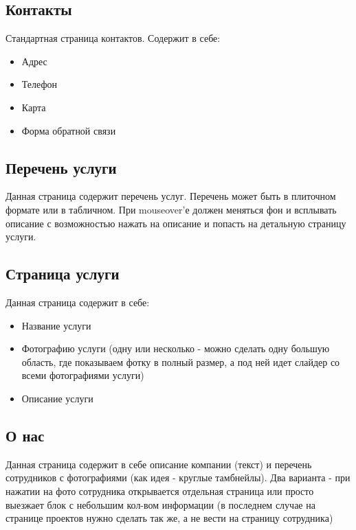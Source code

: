 \documentclass[DIV=calc, paper=a4, fontsize=11pt]{scrartcl} %
\begin{document}
\subsection{Контакты}

Стандартная страница контактов. Содержит в себе:

\begin{itemize}
	\item Адрес
	\item Телефон
	\item Карта
	\item Форма обратной связи
\end{itemize}

\subsection{Перечень услуги}
Данная страница содержит перечень услуг. Перечень может быть в плиточном формате или в табличном. При mouseover'е должен меняться фон и всплывать описание с возможностью нажать на описание и попасть на детальную страницу услуги.

\subsection{Страница услуги}
Данная страница содержит в себе:
\begin{itemize}
	\item Название услуги
	\item Фотографию услуги (одну или несколько - можно сделать одну большую область, где показываем фотку в полный размер, а под ней идет слайдер со всеми фотографиями услуги)
	\item Описание услуги
\end{itemize}

\subsection{О нас}
Данная страница содержит в себе описание компании (текст) и перечень сотрудников с фотографиями (как идея - круглые тамбнейлы). Два варианта - при нажатии на фото сотрудника открывается отдельная страница или просто выезжает блок с небольшим кол-вом информации (в последнем случае на странице проектов нужно сделать так же, а не вести на страницу сотрудника)
\end{document}
